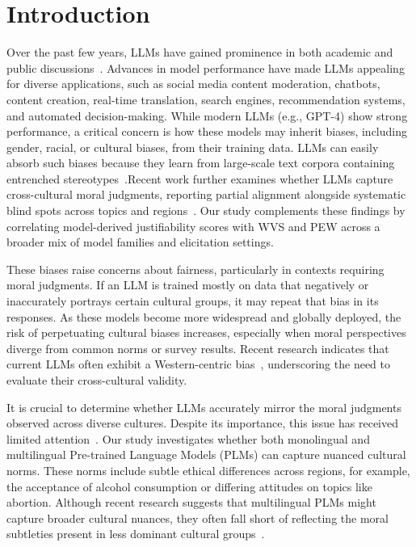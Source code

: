 \documentclass[runningheads]{llncs}
\begin{document}
\section{Introduction}
Over the past few years, LLMs have gained prominence in both academic and public discussions~\cite{Bender2021}. Advances in model performance have made LLMs appealing for diverse applications, such as social media content moderation, chatbots, content creation, real-time translation, search engines, recommendation systems, and automated decision-making. While modern LLMs (e.g., GPT-4) show strong performance, a critical concern is how these models may inherit biases, including gender, racial, or cultural biases, from their training data. LLMs can easily absorb such biases because they learn from large-scale text corpora containing entrenched stereotypes~\cite{Staczak2021,Karpouzis2024}.Recent work further examines whether LLMs capture cross-cultural moral judgments, reporting partial alignment alongside systematic blind spots across topics and regions~\cite{mohammadi2025morality}. Our study complements these findings by correlating model-derived justifiability scores with WVS and PEW across a broader mix of model families and elicitation settings.


These biases raise concerns about fairness, particularly in contexts requiring moral judgments. If an LLM is trained mostly on data that negatively or inaccurately portrays certain cultural groups, it may repeat that bias in its responses. As these models become more widespread and globally deployed, the risk of perpetuating cultural biases increases, especially when moral perspectives diverge from common norms or survey results. Recent research indicates that current LLMs often exhibit a Western-centric bias~\cite{adilazuarda2024towards}, underscoring the need to evaluate their cross-cultural validity.


It is crucial to determine whether LLMs accurately mirror the moral judgments observed across diverse cultures. Despite its importance, this issue has received limited attention~\cite{arora2023probing,liu2024multilingual}. Our study investigates whether both monolingual and multilingual Pre-trained Language Models (PLMs) can capture nuanced cultural norms. These norms include subtle ethical differences across regions, for example, the acceptance of alcohol consumption or differing attitudes on topics like abortion. Although recent research suggests that multilingual PLMs might capture broader cultural nuances, they often fall short of reflecting the moral subtleties present in less dominant cultural groups~\cite{Hammerl2022,papadopoulou2024}.
\end{document}

